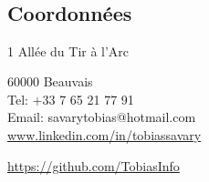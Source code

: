 \documentclass[9pt, oneside, a4paper, titlepage]{extarticle}
\begin{document}
    \begin{tcolorbox}
        \vspace*{0.2cm}
        \hspace*{0.7mm}
        \begin{minipage}[t]{6.2cm}
            \begin{spacing}{0.95}
            \vspace*{-0.5cm}
            \begin{tcolorbox}[grow to left by = 0.6cm, colback = gray!25, colframe = white]
                
                \section*{\\Coordonnées}
                \hspace*{0.4cm}
                1 Allée du Tir à l'Arc

                \hspace*{0.4cm}
                \vspace*{0.2cm}
                60000 Beauvais\\
                \hspace*{0.4cm}
                Tel: +33 7 65 21 77 91\\
                \hspace*{0.4cm}
                Email: savarytobias@hotmail.com\\
                
                
                \vspace*{0.1cm}
                \hspace*{0.2cm} \href{www.linkedin.com/in/tobiassavary}{www.linkedin.com/in/tobiassavary}
                
                \vspace*{0.3cm}

                \hspace*{0.2cm} \href{https://github.com/TobiasInfo}{https://github.com/TobiasInfo}
                \vspace*{0.2cm}


\end{tcolorbox}
\end{spacing}
\end{minipage}
\end{tcolorbox}
\end{document}
